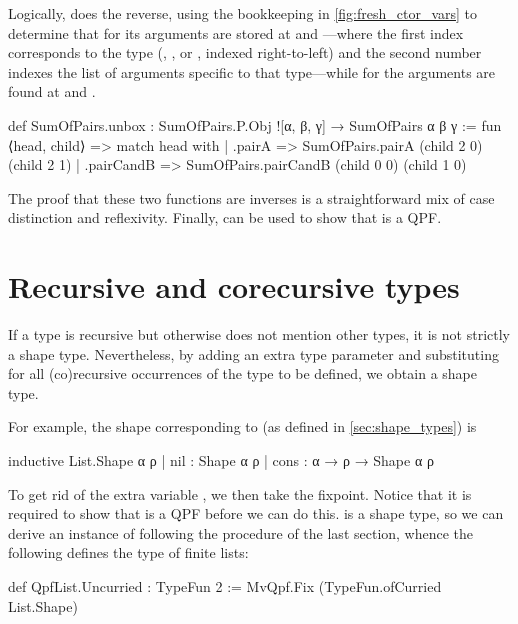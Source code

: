 Logically,  does the reverse, using the bookkeeping in \cref{fig:fresh_ctor_vars} to determine
that for  its arguments are stored at  and ---where the first index corresponds to the type (, , or , indexed right-to-left) and the second number indexes the list of arguments specific to that type---while for
 the arguments are found at  and .
\begin{leancode}
    def SumOfPairs.unbox : SumOfPairs.P.Obj ![α, β, γ] → SumOfPairs α β γ
      := fun ⟨head, child⟩ => match head with
          | .pairA      => SumOfPairs.pairA (child 2 0) (child 2 1)
          | .pairCandB  => SumOfPairs.pairCandB (child 0 0) (child 1 0)
  \end{leancode}

The proof that these two functions are inverses is a straightforward mix of case distinction and reflexivity.
Finally,  can be used to show that  is a QPF.






\section{Recursive and corecursive types}%
\label{sec:rec_types}
If a type is recursive but otherwise does not mention other types, it is not strictly a shape type.
Nevertheless, by adding an extra type parameter  and substituting  for all (co)recursive occurrences of the type
to be defined, we obtain a shape type.

For example, the shape corresponding to  (as defined in \cref{sec:shape_types}) is
\begin{leancode}
  inductive List.Shape α ρ
    | nil  : Shape α ρ
    | cons : α → ρ → Shape α ρ
\end{leancode}

To get rid of the extra variable , we then take the fixpoint. Notice that it is required to show 
that  is a QPF before we can do this.
 is a shape type,
so we can derive an instance of  following the procedure of the last section, whence the
following defines the type of finite lists:
\begin{leancode}
  def QpfList.Uncurried : TypeFun 2 
    := MvQpf.Fix (TypeFun.ofCurried List.Shape)
\end{leancode}



